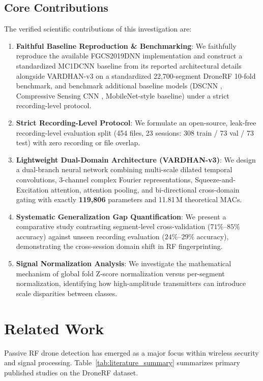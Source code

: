 \documentclass[journal,10pt,twocolumn]{IEEEtran}
\begin{document}
\subsection{Core Contributions}
The verified scientific contributions of this investigation are:
\begin{enumerate}
    \item \textbf{Faithful Baseline Reproduction \& Benchmarking}: We faithfully reproduce the available FGCS2019DNN \cite{alsad2019rf} implementation and construct a standardized MC1DCNN \cite{allahham2020deep} baseline from its reported architectural details alongside VARDHAN-v3 on a standardized 22,700-segment DroneRF 10-fold benchmark, and benchmark additional baseline models (DSCNN \cite{medaiyese2021machine}, Compressive Sensing CNN \cite{mo2022deep}, MobileNet-style baseline) under a strict recording-level protocol.
    \item \textbf{Strict Recording-Level Protocol}: We formulate an open-source, leak-free recording-level evaluation split (454 files, 23 sessions: 308 train / 73 val / 73 test) with zero recording or file overlap.
    \item \textbf{Lightweight Dual-Domain Architecture (VARDHAN-v3)}: We design a dual-branch neural network combining multi-scale dilated temporal convolutions, 3-channel complex Fourier representations, Squeeze-and-Excitation attention, attention pooling, and bi-directional cross-domain gating with exactly \textbf{119,806} parameters and 11.81\,M theoretical MACs.
    \item \textbf{Systematic Generalization Gap Quantification}: We present a comparative study contrasting segment-level cross-validation ($71\%\text{--}85\%$ accuracy) against unseen recording evaluation ($24\%\text{--}29\%$ accuracy), demonstrating the cross-session domain shift in RF fingerprinting.
    \item \textbf{Signal Normalization Analysis}: We investigate the mathematical mechanism of global fold Z-score normalization versus per-segment normalization, identifying how high-amplitude transmitters can introduce scale disparities between classes.
\end{enumerate}

\section{Related Work}
Passive RF drone detection has emerged as a major focus within wireless security and signal processing. Table~\ref{tab:literature_summary} summarizes primary published studies on the DroneRF dataset.
\end{document}
